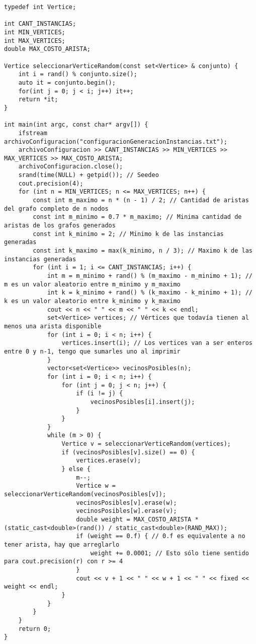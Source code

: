 \begin{lstlisting}[frame=single]
typedef int Vertice;

int CANT_INSTANCIAS;
int MIN_VERTICES;
int MAX_VERTICES;
double MAX_COSTO_ARISTA;

Vertice seleccionarVerticeRandom(const set<Vertice> & conjunto) {
    int i = rand() % conjunto.size();
    auto it = conjunto.begin();
    for(int j = 0; j < i; j++) it++;
    return *it;
}

int main(int argc, const char* argv[]) {
    ifstream archivoConfiguracion("configuracionGeneracionInstancias.txt");
    archivoConfiguracion >> CANT_INSTANCIAS >> MIN_VERTICES >> MAX_VERTICES >> MAX_COSTO_ARISTA;
    archivoConfiguracion.close();
    srand(time(NULL) + getpid()); // Seedeo
    cout.precision(4);
    for (int n = MIN_VERTICES; n <= MAX_VERTICES; n++) {
        const int m_maximo = n * (n - 1) / 2; // Cantidad de aristas del grafo completo de n nodos
        const int m_minimo = 0.7 * m_maximo; // Minima cantidad de aristas de los grafos generados
        const int k_minimo = 2; // Minimo k de las instancias generadas
        const int k_maximo = max(k_minimo, n / 3); // Maximo k de las instancias generadas
        for (int i = 1; i <= CANT_INSTANCIAS; i++) {
            int m = m_minimo + rand() % (m_maximo - m_minimo + 1); // m es un valor aleatorio entre m_minimo y m_maximo
            int k = k_minimo + rand() % (k_maximo - k_minimo + 1); // k es un valor aleatorio entre k_minimo y k_maximo
            cout << n << " " << m << " " << k << endl;
            set<Vertice> vertices; // Vértices que todavía tienen al menos una arista disponible
            for (int i = 0; i < n; i++) {
                vertices.insert(i); // Los vertices van a ser enteros entre 0 y n-1, tengo que sumarles uno al imprimir
            }
            vector<set<Vertice>> vecinosPosibles(n);
            for (int i = 0; i < n; i++) {
                for (int j = 0; j < n; j++) {
                    if (i != j) {
                        vecinosPosibles[i].insert(j);
                    }
                }
            }
            while (m > 0) {
                Vertice v = seleccionarVerticeRandom(vertices);
                if (vecinosPosibles[v].size() == 0) {
                    vertices.erase(v);
                } else {
                    m--;
                    Vertice w = seleccionarVerticeRandom(vecinosPosibles[v]);
                    vecinosPosibles[v].erase(w);
                    vecinosPosibles[w].erase(v);
                    double weight = MAX_COSTO_ARISTA * (static_cast<double>(rand()) / static_cast<double>(RAND_MAX));
                    if (weight == 0.f) { // 0.f es equivalente a no tener arista, hay que arreglarlo
                        weight += 0.0001; // Esto sólo tiene sentido para cout.precision(r) con r >= 4
                    }
                    cout << v + 1 << " " << w + 1 << " " << fixed << weight << endl;
                }
            }
        }
    }
    return 0;
}
\end{lstlisting}
